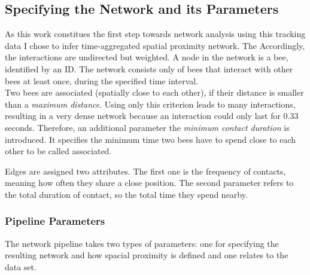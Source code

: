 \subsection{Specifying the Network and its Parameters}
As this work constitues the first step towards network analysis using this tracking data I chose to infer time-aggregated spatial proximity network. The Accordingly, the interactions are undirected but weighted.
A node in the network is a bee, identified by an ID.
The network consists only of bees that interact with other bees at least once, during the specified time interval.\\
Two bees are associated (spatially close to each other), if their distance is smaller than a \emph{maximum distance}.
Using only this criterion leads to many interactions, resulting in a very dense network because an interaction could only last for 0.33 seconds.
Therefore, an additional parameter the \emph{minimum contact duration} is introduced.
It specifies the minimum time two bees have to spend close to each other to be called associated.

Edges are assigned two attributes.
The first one is the frequency of contacts, meaning how often they share a close position. The second parameter refers to the total duration of contact, so the total time they spend nearby.

\subsubsection{Pipeline Parameters}
The network pipeline takes two types of parameters: one for specifying the resulting network and how spacial proximity is defined and one relates to the data set.

